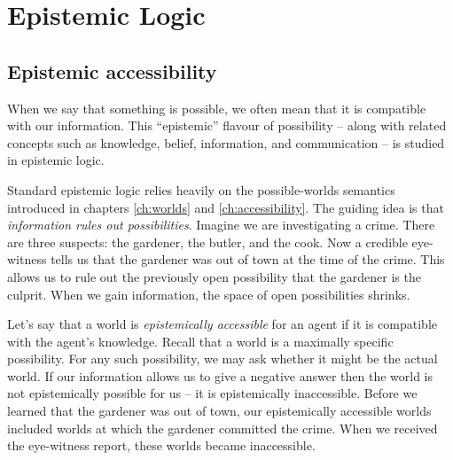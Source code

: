 \chapter{Epistemic Logic}\label{ch:epistemic}


\section{Epistemic accessibility}

When we say that something is possible, we often mean that it is compatible with
our information. This ``epistemic'' flavour of possibility -- along with related
concepts such as knowledge, belief, information, and communication -- is studied
in epistemic logic.

Standard epistemic logic relies heavily on the possible-worlds semantics
introduced in chapters \ref{ch:worlds} and \ref{ch:accessibility}. The guiding
idea is that \emph{information rules out possibilities}. Imagine we are
investigating a crime. There are three suspects: the gardener, the butler, and
the cook. Now a credible eye-witness tells us that the gardener was out of town at
the time of the crime. This allows us to rule out the previously open
possibility that the gardener is the culprit. When we gain information, the
space of open possibilities shrinks.


Let's say that a world is \emph{epistemically accessible} for an agent if it is
compatible with the agent's knowledge. Recall that a world is a maximally
specific possibility. For any such possibility, we may ask whether it might be
the actual world. If our information allows us to give a negative answer then
the world is not epistemically possible for us -- it is epistemically
inaccessible. Before we learned that the gardener was out of town, our
epistemically accessible worlds included worlds at which the gardener committed
the crime. When we received the eye-witness report, these worlds became
inaccessible.

